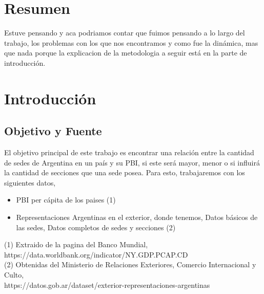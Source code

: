 \documentclass[10pt,a4paper]{article}
\begin{document}

\maketitle

\restoregeometry


\section{Resumen} \vspace{0.3cm}

Estuve pensando y aca podriamos contar que fuimos pensando a lo largo del trabajo, los problemas con los que nos encontramos y como fue la dinámica, mas que nada porque la explicacion de la metodologia a seguir está en la parte de introducción.

\section{Introducción} \vspace{0.1cm}

\subsection{Objetivo y Fuente} \vspace{0.3cm}

El objetivo principal de este trabajo es encontrar una relación entre la cantidad de sedes de Argentina en un país y su PBI, si este será mayor, menor o si influirá la cantidad de secciones que una sede posea.  Para esto, trabajaremos con los siguientes datos, 

\begin{itemize}
	\item PBI per cápita de los paises (1)
	\item Representaciones Argentinas en el exterior, donde tenemos, Datos básicos de las sedes, Datos completos de sedes y secciones (2)
\end{itemize}

\noindent (1) Extraido de la pagina del Banco Mundial, https://data.worldbank.org/indicator/NY.GDP.PCAP.CD \\

\noindent (2) Obtenidas del Ministerio de Relaciones Exteriores, Comercio Internacional y Culto, \\ https://datos.gob.ar/dataset/exterior-representaciones-argentinas \vspace{0.1cm}
 
\end{document}
